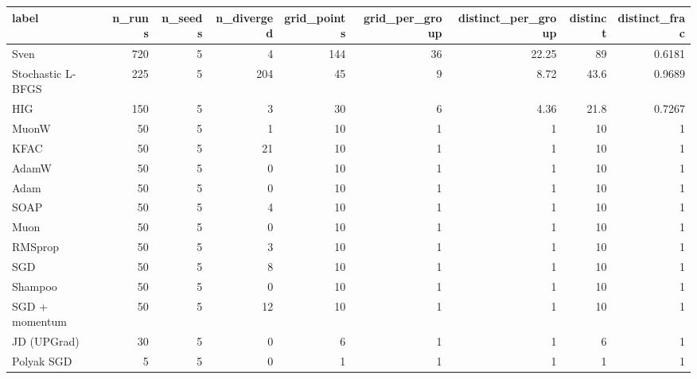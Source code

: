 \begin{tabular}{lrrrrrrrr}
\toprule
label & n\_runs & n\_seeds & n\_diverged & grid\_points & grid\_per\_group & distinct\_per\_group & distinct & distinct\_frac \\
\midrule
Sven & 720 & 5 & 4 & 144 & 36 & 22.25 & 89 & 0.6181 \\
Stochastic L-BFGS & 225 & 5 & 204 & 45 & 9 & 8.72 & 43.6 & 0.9689 \\
HIG & 150 & 5 & 3 & 30 & 6 & 4.36 & 21.8 & 0.7267 \\
MuonW & 50 & 5 & 1 & 10 & 1 & 1 & 10 & 1 \\
KFAC & 50 & 5 & 21 & 10 & 1 & 1 & 10 & 1 \\
AdamW & 50 & 5 & 0 & 10 & 1 & 1 & 10 & 1 \\
Adam & 50 & 5 & 0 & 10 & 1 & 1 & 10 & 1 \\
SOAP & 50 & 5 & 4 & 10 & 1 & 1 & 10 & 1 \\
Muon & 50 & 5 & 0 & 10 & 1 & 1 & 10 & 1 \\
RMSprop & 50 & 5 & 3 & 10 & 1 & 1 & 10 & 1 \\
SGD & 50 & 5 & 8 & 10 & 1 & 1 & 10 & 1 \\
Shampoo & 50 & 5 & 0 & 10 & 1 & 1 & 10 & 1 \\
SGD + momentum & 50 & 5 & 12 & 10 & 1 & 1 & 10 & 1 \\
JD (UPGrad) & 30 & 5 & 0 & 6 & 1 & 1 & 6 & 1 \\
Polyak SGD & 5 & 5 & 0 & 1 & 1 & 1 & 1 & 1 \\
\bottomrule
\end{tabular}
